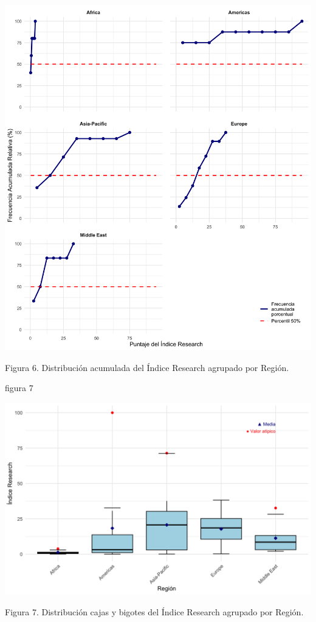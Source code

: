 \documentclass[
]{article}
\begin{document}
\begin{multicols}{2}
\begin{center}
\includegraphics[width=\linewidth]{figura6.png}
\end{center}
Figura 6. Distribución acumulada del Índice Research agrupado por Región.

figura 7



\begin{center}
\includegraphics[width=\linewidth]{figura7.png}
\end{center}
Figura 7. Distribución cajas y bigotes del Índice Research agrupado por Región.



\end{multicols}
\end{document}
